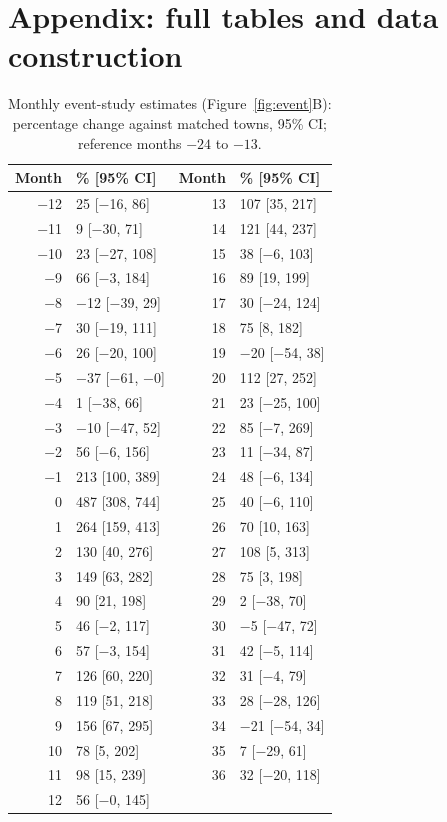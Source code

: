 \documentclass[11pt,a4paper]{article}
\begin{document}
\appendix
\section{Appendix: full tables and data construction}
\begin{table}[tbp]\centering\small\caption{Monthly event-study estimates (Figure~\ref{fig:event}B): percentage change against matched towns, 95\% CI; reference months $-24$ to $-13$.}\label{tab:es}\begin{tabular}{rl@{\hskip 24pt}rl}\toprule Month & \% [95\% CI] & Month & \% [95\% CI]\\\midrule
$-$12 & 25 [$-$16, 86] & 13 & 107 [35, 217]\\
$-$11 & 9 [$-$30, 71] & 14 & 121 [44, 237]\\
$-$10 & 23 [$-$27, 108] & 15 & 38 [$-$6, 103]\\
$-$9 & 66 [$-$3, 184] & 16 & 89 [19, 199]\\
$-$8 & $-$12 [$-$39, 29] & 17 & 30 [$-$24, 124]\\
$-$7 & 30 [$-$19, 111] & 18 & 75 [8, 182]\\
$-$6 & 26 [$-$20, 100] & 19 & $-$20 [$-$54, 38]\\
$-$5 & $-$37 [$-$61, $-$0] & 20 & 112 [27, 252]\\
$-$4 & 1 [$-$38, 66] & 21 & 23 [$-$25, 100]\\
$-$3 & $-$10 [$-$47, 52] & 22 & 85 [$-$7, 269]\\
$-$2 & 56 [$-$6, 156] & 23 & 11 [$-$34, 87]\\
$-$1 & 213 [100, 389] & 24 & 48 [$-$6, 134]\\
0 & 487 [308, 744] & 25 & 40 [$-$6, 110]\\
1 & 264 [159, 413] & 26 & 70 [10, 163]\\
2 & 130 [40, 276] & 27 & 108 [5, 313]\\
3 & 149 [63, 282] & 28 & 75 [3, 198]\\
4 & 90 [21, 198] & 29 & 2 [$-$38, 70]\\
5 & 46 [$-$2, 117] & 30 & $-$5 [$-$47, 72]\\
6 & 57 [$-$3, 154] & 31 & 42 [$-$5, 114]\\
7 & 126 [60, 220] & 32 & 31 [$-$4, 79]\\
8 & 119 [51, 218] & 33 & 28 [$-$28, 126]\\
9 & 156 [67, 295] & 34 & $-$21 [$-$54, 34]\\
10 & 78 [5, 202] & 35 & 7 [$-$29, 61]\\
11 & 98 [15, 239] & 36 & 32 [$-$20, 118]\\
12 & 56 [$-$0, 145] & &\\
\bottomrule\end{tabular}\end{table}
\end{document}
